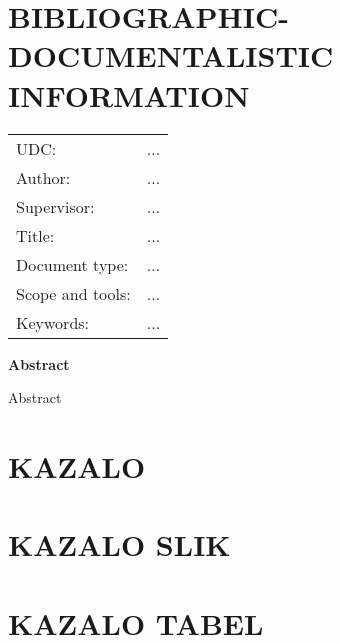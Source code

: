 \section*{BIBLIOGRAPHIC-DOCUMENTALISTIC INFORMATION}

\begin{bf}
    \vspace{-1.5mm}\hspace{-2.25mm}
    \begin{tabular}{p{3.75cm} l}
        UDC: &  ... \\
        Author: & ...\\
        Supervisor: & ...\\
        Title: & ...\\
        Document type: & ... \\
        Scope and tools:  & ...\\
        Keywords: & ...
    \end{tabular}
\end{bf}

\vspace{1cm}

\noindent\textbf{Abstract}

\vspace{4mm}

\noindent Abstract
\break





\newpage
{}
\section*{KAZALO}
\vspace{-1.1cm}\tableofcontents

\newpage
{}
\section*{KAZALO SLIK}
\vspace{-0.8cm}\listoffigures



\newpage
{}
\section*{KAZALO TABEL}
\vspace{-0.8cm}\listoftables
